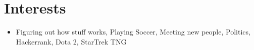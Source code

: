 \documentclass[letterpaper,11pt]{article}
\newcommand{\resumeSubHeadingListStart}{\begin{itemize}[leftmargin=*]}
\newcommand{\resumeSubHeadingListEnd}{\end{itemize}}
\begin{document}
\section{Interests}
  \resumeSubHeadingListStart
    \item{
      {Figuring out how stuff works, Playing Soccer, Meeting new people, Politics, Hackerrank, Dota 2, StarTrek TNG}
    }
  \resumeSubHeadingListEnd

\end{document}
